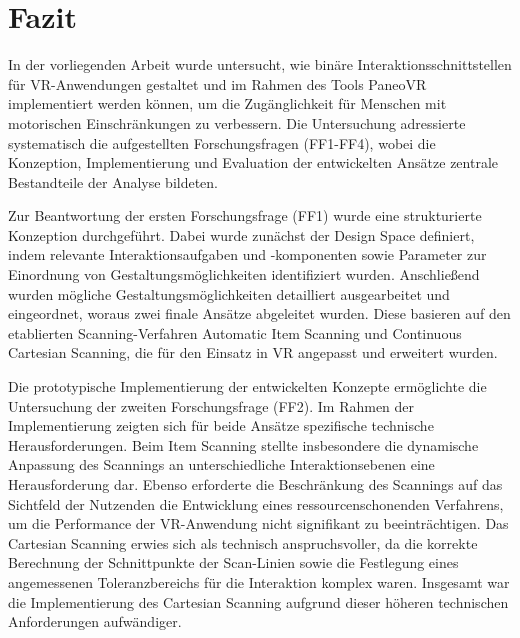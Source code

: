 \chapter{Fazit}
\label{chap:Fazit und Ausblick}

In der vorliegenden Arbeit wurde untersucht, wie binäre Interaktionsschnittstellen für VR-Anwendungen gestaltet und im Rahmen des Tools PaneoVR implementiert werden können, um die Zugänglichkeit für Menschen mit motorischen Einschränkungen zu verbessern. Die Untersuchung adressierte systematisch die aufgestellten Forschungsfragen (FF1-FF4), wobei die Konzeption, Implementierung und Evaluation der entwickelten Ansätze zentrale Bestandteile der Analyse bildeten.

Zur Beantwortung der ersten Forschungsfrage (FF1) wurde eine strukturierte Konzeption durchgeführt. Dabei wurde zunächst der Design Space definiert, indem relevante Interaktionsaufgaben und -komponenten sowie Parameter zur Einordnung von Gestaltungsmöglichkeiten identifiziert wurden. Anschließend wurden mögliche Gestaltungsmöglichkeiten detailliert ausgearbeitet und eingeordnet, woraus zwei finale Ansätze abgeleitet wurden. Diese basieren auf den etablierten Scanning-Verfahren Automatic Item Scanning und Continuous Cartesian Scanning, die für den Einsatz in VR angepasst und erweitert wurden.

Die prototypische Implementierung der entwickelten Konzepte ermöglichte die Untersuchung der zweiten Forschungsfrage (FF2). Im Rahmen der Implementierung zeigten sich für beide Ansätze spezifische technische Herausforderungen. Beim Item Scanning stellte insbesondere die dynamische Anpassung des Scannings an unterschiedliche Interaktionsebenen eine Herausforderung dar. Ebenso erforderte die Beschränkung des Scannings auf das Sichtfeld der Nutzenden die Entwicklung eines ressourcenschonenden Verfahrens, um die Performance der VR-Anwendung nicht signifikant zu beeinträchtigen. Das Cartesian Scanning erwies sich als technisch anspruchsvoller, da die korrekte Berechnung der Schnittpunkte der Scan-Linien sowie die Festlegung eines angemessenen Toleranzbereichs für die Interaktion komplex waren. Insgesamt war die Implementierung des Cartesian Scanning aufgrund dieser höheren technischen Anforderungen aufwändiger.

